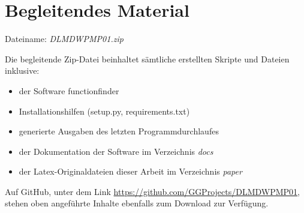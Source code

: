 \chapter{Begleitendes Material}


Dateiname: \emph{DLMDWPMP01.zip}
 
\vspace*{5mm}

Die begleitende Zip-Datei beinhaltet sämtliche erstellten Skripte und Dateien inklusive:
\begin{itemize}
 \itemsep0pt
 \item der Software \glqq functionfinder\grqq
 \item Installationshilfen (setup.py, requirements.txt)
 \item generierte Ausgaben des letzten Programmdurchlaufes
 \item der Dokumentation der Software im Verzeichnis \emph{docs}
 \item der Latex-Originaldateien dieser Arbeit im Verzeichnis \emph{paper}
\end{itemize}

\vspace*{5mm}

Auf GitHub, unter dem Link \url{https://github.com/GGProjects/DLMDWPMP01}, stehen oben angeführte Inhalte ebenfalls zum Download zur Verfügung.



